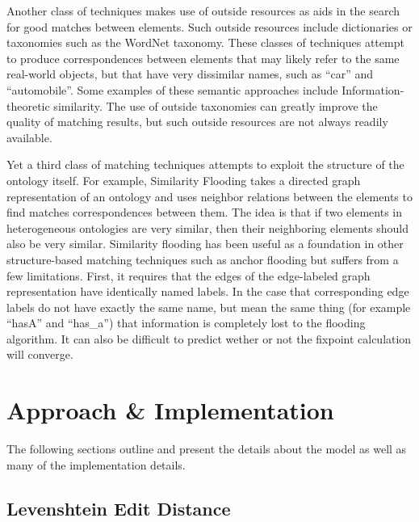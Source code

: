 \documentclass[letterpaper,twocolumn,12pt]{article}
\begin{document}
Another class of techniques makes use of outside resources as aids in the search for
good matches between elements. Such outside resources include dictionaries or taxonomies
such as the WordNet taxonomy. These classes of techniques attempt to produce correspondences
between elements that may likely refer to the same real-world objects, but that have very
dissimilar names, such as ``car'' and ``automobile''. Some examples of these semantic 
approaches include Information-theoretic similarity.
%
The use of outside taxonomies can greatly improve the quality of matching results,
but such outside resources are not always readily available.

Yet a third class of matching techniques attempts to exploit the structure of the ontology
itself. For example, Similarity Flooding takes a directed graph representation of an 
ontology and uses neighbor relations between the elements to find matches correspondences
between them. The idea is that if two elements in heterogeneous ontologies are very similar,
then their neighboring elements should also be very similar.
%
Similarity flooding has been useful as a foundation in other structure-based
matching techniques such as anchor flooding 
but suffers from 
a few limitations. First, it requires that the edges of the edge-labeled graph 
representation have identically named labels. In the case that corresponding edge labels
do not have exactly the same name, but mean the same thing (for example ``hasA'' and ``has\_a'')
that information is completely lost to the flooding algorithm. It can also be difficult to predict
wether or not the fixpoint calculation will converge.
\newline

\section{Approach \& Implementation}
\label{sec:approach}

The following sections outline and present the details about the model as well as 
many of the implementation details.

\subsection{Levenshtein Edit Distance}
\end{document}
